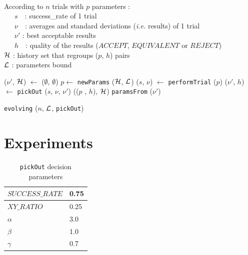 \documentclass{beamer}
\begin{document}
\begin{frame}
  ~\\
  \footnotesize{
    According to $n$ trials with $p$ parameters :\\
    ~~~$s$~~: success\_rate of 1 trial\\
    ~~~$\nu$~~: averages and standard deviations (\emph{i.e.} results) of 1 trial\\
    ~~~$\nu'$ : best acceptable results\\
    ~~~$h$~~: quality of the results ($ACCEPT$, $EQUIVALENT$ or $REJECT$)\\
    ${\cal{H}}$ : history set that regroups ($p$, $h$) pairs\\
    ${\cal{L}}$ : parameters bound\\
  }
  \begin{algorithm}[H]
    \scriptsize
    \begin{algorithmic}[1]
\STATE ($\nu'$, ${\cal{H}}$) $\leftarrow$ ($\emptyset$, $\emptyset$)
\STATE $p \leftarrow$ {\tt newParams} (${\cal{H}}$, ${\cal{L}}$)
\STATE ($s$, $\nu$) $\leftarrow$ {\tt performTrial} ($p$)
\STATE ($\nu'$, $h$) $\leftarrow$ {\tt pickOut} ($s$, $\nu$, $\nu'$)
 (($p$ , $h$), ${\cal{H}}$)
\ENDFOR
{} {\tt paramsFrom} ($\nu'$)
    \end{algorithmic}
    \caption{{\tt evolving} ($n$, ${\cal{L}}$, {\tt pickOut})}
  \end{algorithm}

\end{frame}


\section{Experiments}

\begin{frame}
\begin{footnotesize}
\begin{table}[h]
\centering
\caption{{\tt pickOut} decision parameters}
\label{tabExp}
\begin{tabular}{|p{3cm}|p{1cm}|}
\hline
$SUCCESS\_RATE$ & 0.75 \\
\hline
$XY\_RATIO$ & 0.25 \\
\hline
$\alpha$ & 3.0 \\
\hline
$\beta$ & 1.0 \\
\hline
$\gamma$ & 0.7 \\
\hline
\end{tabular}
\end{table}
\end{footnotesize}
\end{frame}
\end{document}
